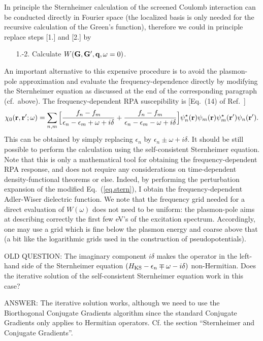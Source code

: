 \documentclass[12pt]{article}
\def\G{{\bf G}}
\def\Gp{{\bf G}^\prime}
\def\q{{\bf q}}
\def\r{{\bf r}}
\def\rp{{\bf r}^\prime}
\def\w{\omega}
\begin{document}
In principle the Sternheimer calculation of the screened Coulomb interaction can be conducted directly
in Fourier space (the localized basis is only needed for the recursive calculation of the Green's function), 
therefore we could in principle replace steps [1.] and [2.] by
\begin{itemize}
\item[1.-2.]
Calculate $W(\G,\Gp,\q,\w=0)$.
\end{itemize}
An important alternative to this expensive procedure is to avoid the plasmon-pole approximation and evaluate
the frequency-dependence directly by modifying the Sternheimer equation as discussed at the end of the 
corresponding paragraph (cf.\ above).
The frequency-dependent RPA suscepibility is [Eq.\ (14) of Ref.\ \cite{tiago}]
 \begin{equation}
 \chi_0 (\r,\rp;\omega) = \sum_{n,m} \Big[ \frac{f_n-f_m}{\epsilon_n-\epsilon_m+\omega+i\delta} +
 \frac{f_n-f_m}{\epsilon_n-\epsilon_m-\omega+i\delta} \Big] \psi_n^\star (\r) \psi_m (\r) \psi_m^\star (\rp) \psi_n (\rp).
 \end{equation}
This can be obtained by simply replacing $\epsilon_n$ by $\epsilon_n\pm\omega+i\delta$. It should be still possible
to perform the calculation using the self-consistent Sternheimer equation. Note that this is only a mathematical
tool for obtaining the frequency-dependent RPA response, and does not require any considerations on time-dependent
density-functional theorems or else.
Indeed, by performing the perturbation expansion
of the modified Eq.\ (\ref{eq.stern}), I obtain the frequency-dependent Adler-Wiser
dielectric function. 
We note that the frequency grid needed for a direct evaluation of $W(\w)$ does not need to be uniform:
the plasmon-pole aims at describing correctly the first few eV's of the excitation spectrum. Accordingly,
one may use a grid which is fine below the plasmon energy and coarse above that (a bit like the
logarithmic grids used in the construction of pseudopotentials).

\noindent
OLD QUESTION: 
The imaginary component $i\delta$ makes the operator in the left-hand side of
the Sternheimer equation $(H_{\rm KS}-\epsilon_n\mp\omega-i\delta)$ non-Hermitian.
Does the iterative solution of the self-consistent Sternheimer equation work in this case?

\noindent
ANSWER: 
The iterative solution works, although we need to use the Biorthogonal Conjugate Gradients
algorithm since the standard Conjugate Gradients only applies to Hermitian operators.
Cf. the section ``Sternheimer and Conjugate Gradients''.
\end{document}
